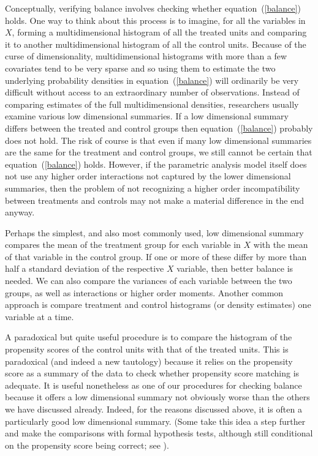 \documentclass[11pt,titlepage]{article}
\begin{document}
Conceptually, verifying balance involves checking whether
equation~(\ref{balance}) holds.  One way to think about this process
is to imagine, for all the variables in $X$, forming a
multidimensional histogram of all the treated units and comparing it
to another multidimensional histogram of all the control units.
Because of the curse of dimensionality, multidimensional histograms
with more than a few covariates tend to be very sparse and so using
them to estimate the two underlying probability densities in
equation~(\ref{balance}) will ordinarily be very difficult without
access to an extraordinary number of observations.  Instead of
comparing estimates of the full multidimensional densities,
researchers usually examine various low dimensional summaries.  If a
low dimensional summary differs between the treated and control groups
then equation~(\ref{balance}) probably does not hold.  The risk of
course is that even if many low dimensional summaries are the same for
the treatment and control groups, we still cannot be certain that
equation~(\ref{balance}) holds.  However, if the parametric analysis
model itself does not use any higher order interactions not captured
by the lower dimensional summaries, then the problem of not
recognizing a higher order incompatibility between treatments and
controls may not make a material difference in the end anyway.

Perhaps the simplest, and also most commonly used, low dimensional
summary compares the mean of the treatment group for each variable in
$X$ with the mean of that variable in the control group.  If one or
more of these differ by more than half a standard deviation of the
respective $X$ variable, then better balance is needed.  We can also
compare the variances of each variable between the two groups, as well
as interactions or higher order moments.  Another common approach is
compare treatment and control histograms (or density estimates) one
variable at a time.

A paradoxical but quite useful procedure is to compare the histogram
of the propensity scores of the control units with that of the treated
units. This is paradoxical (and indeed a new tautology) because it
relies on the propensity score as a summary of the data to check
whether propensity score matching is adequate.  It is useful
nonetheless as one of our procedures for checking balance because it
offers a low dimensional summary not obviously worse than the others
we have discussed already.  Indeed, for the reasons discussed above,
it is often a particularly good low dimensional summary. (Some take
this idea a step further and make the comparisons with formal
hypothesis tests, although still conditional on the propensity score
being correct; see \citet{Sekhon04b}).
\end{document}
